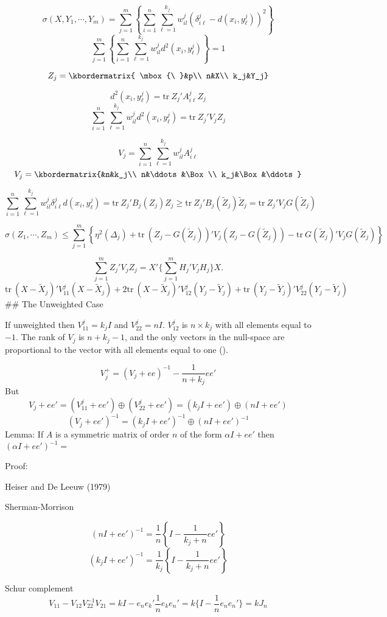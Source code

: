 \documentclass[
  12pt,
]{article}
\begin{document}
\[
\sigma(X,Y_1,\cdots,Y_m) = 
\sum_{j=1}^m\left\{\sum_{i=1}^n\sum_{\ell=1}^{k_j}w_{il}^j(\delta_{i\ell}^j-d(x_i,y_\ell^j))^2\right\}
\]
\[
\sum_{j=1}^m\left\{\sum_{i=1}^n\sum_{\ell=1}^{k_j}w_{il}^jd^2(x_i,y_\ell^j)\right\}=1
\]

\[
Z_j=\kbordermatrix{
\mbox{\ }&p\\
n&X\\
k_j&Y_j}
\]

\[
d^2(x_i,y_\ell^j)=\text{tr}\ Z_j'A^j_{i\ell}Z_j^{\ }
\]
\[
\sum_{i=1}^n\sum_{\ell=1}^{k_j}w_{il}^jd^2(x_i,y_\ell^j)=\text{tr}\ Z_j'V_jZ_j
\]

\[
V_j=\sum_{i=1}^n\sum_{\ell=1}^{k_j}w_{il}^jA^j_{i\ell}
\]
\[
V_j=\kbordermatrix{&n&k_j\\
n&\ddots&\Box\\
k_j&\Box&\ddots}
\]

\[
\sum_{i=1}^n\sum_{\ell=1}^{k_j}w_{il}^j\delta_{i\ell}^jd(x_i,y_\ell^j)=\text{tr}\ Z_j'B_j(Z_j)Z_j\geq\text{tr}\ Z_j'B_j(\tilde Z_j)\tilde Z_j=\text{tr}\ Z_j'V_jG(\tilde Z_j)
\]

\[
\sigma(Z_1,\cdots,Z_m)\leq\sum_{j=1}^m\left\{\eta^2(\Delta_j)+\text{tr}\ (Z_j-G(\tilde Z_j))'V_j(Z_j-G(\tilde Z_j))-\text{tr}\ G(\tilde Z_j)'V_jG(\tilde Z_j)\right\}
\]

\[
\sum_{j=1}^m Z_j'V_jZ_j=X'\{\sum_{j=1}^mH_j'V_jH_j\}X.
\]
\[
\text{tr}\ (X-\tilde X_j)'V_{11}^j(X-\tilde X_j)+2\text{tr}\ (X-\tilde X_j)'V_{12}^j(Y_j-\tilde Y_j)+\text{tr}\ (Y_j-\tilde Y_j)'V_{22}^j(Y_j-\tilde Y_j)
\]
\#\# The Unweighted Case

If unweighted then \(V_{11}^j=k_jI\) and \(V_{22}^j=nI\). \(V_{12}^j\) is \(n\times k_j\) with all elements equal to \(-1\). The rank of \(V_j\) is \(n+k_j-1\), and the only vectors in the null-space are proportional to the vector with all elements equal to one ().

\[V_j^+=(V_j+ee)^{-1}-\frac{1}{n+k_j}ee'\]
But
\[V_j+ee'=(V_{11}^j+ee')\oplus(V_{22}^j+ee')=(k_jI+ee')\oplus(nI+ee')\]
\[(V_j+ee')^{-1}=(k_jI+ee')^{-1}\oplus(nI+ee')^{-1}\]
Lemma: If \(A\) is a symmetric matrix of order \(n\) of the form
\(\alpha I+ee'\) then \((\alpha I+ee')^{-1}=\)

Proof:

Heiser and De Leeuw (1979)

Sherman-Morrison

\[
(n I+ee')^{-1}=\frac{1}{n}\left\{I-\frac{1}{k_j+n}ee'\right\}\]
\[
(k_j I+ee')^{-1}=\frac{1}{k_j}\left\{I-\frac{1}{k_j+n}ee'\right\}\]

Schur complement \[V_{11}-V_{12}V_{22}^{-1}V_{21}=kI-e_ne_k'\frac{1}{n}e_ke_n'=k\{I-\frac{1}{n}e_ne_n'\}=kJ_n\]
\end{document}
